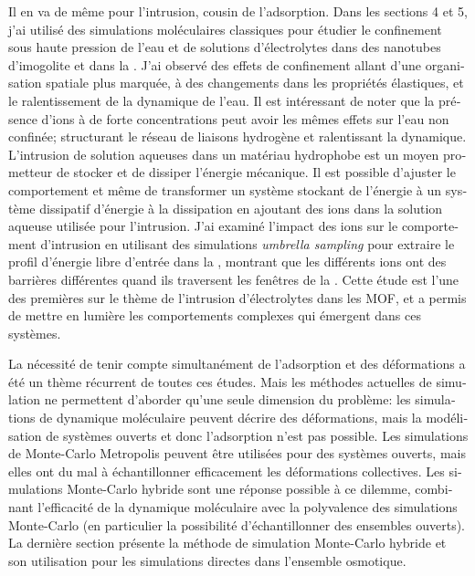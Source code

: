 \documentclass[thesis]{subfiles}
\begin{document}
\begin{otherlanguage}{french}
Il en va de même pour l'intrusion, cousin de l'adsorption. Dans les sections 4 et
5, j'ai utilisé des simulations moléculaires classiques pour étudier le
confinement sous haute pression de l'eau et de solutions d'électrolytes dans des
nanotubes d'imogolite et dans la . J'ai observé des effets de confinement
allant d'une organisation spatiale plus marquée, à des changements dans les
propriétés élastiques, et le ralentissement de la dynamique de l'eau. Il est
intéressant de noter que la présence d'ions à de forte concentrations peut avoir
les mêmes effets sur l'eau non confinée; structurant le réseau de liaisons
hydrogène et ralentissant la dynamique. L'intrusion de solution aqueuses dans un
matériau hydrophobe est un moyen prometteur de stocker et de dissiper l'énergie
mécanique. Il est possible d'ajuster le comportement et même de transformer un
système stockant de l'énergie à un système dissipatif d'énergie à la dissipation
en ajoutant des ions dans la solution aqueuse utilisée pour l'intrusion. J'ai
examiné l'impact des ions sur le comportement d'intrusion en utilisant des
simulations \emph{umbrella sampling} pour extraire le profil d'énergie libre
d'entrée dans la , montrant que les différents ions ont des barrières
différentes quand ils traversent les fenêtres de la . Cette étude est l'une
des premières sur le thème de l'intrusion d'électrolytes dans les MOF, et a
permis de mettre en lumière les comportements complexes qui émergent dans ces
systèmes.

La nécessité de tenir compte simultanément de l'adsorption et des déformations a
été un thème récurrent de toutes ces études. Mais les méthodes actuelles de
simulation ne permettent d'aborder qu'une seule dimension du problème: les
simulations de dynamique moléculaire peuvent décrire des déformations, mais la
modélisation de systèmes ouverts et donc l'adsorption n'est pas possible. Les
simulations de Monte-Carlo Metropolis peuvent être utilisées pour des systèmes
ouverts, mais elles ont du mal à échantillonner efficacement les déformations
collectives. Les simulations Monte-Carlo hybride sont une réponse possible à ce
dilemme, combinant l'efficacité de la dynamique moléculaire avec la polyvalence
des simulations Monte-Carlo (en particulier la possibilité d'échantillonner des
ensembles ouverts). La dernière section présente la méthode de simulation
Monte-Carlo hybride et son utilisation pour les simulations directes dans
l'ensemble osmotique.


\end{otherlanguage}
\end{document}

